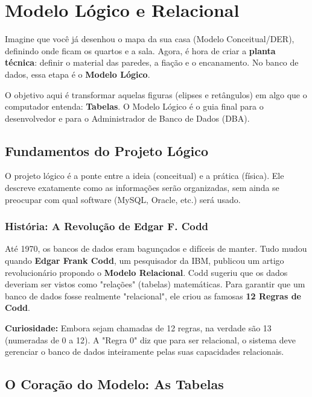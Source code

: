 \chapter{Modelo Lógico e Relacional}
\label{cap:modelo_logico}

Imagine que você já desenhou o mapa da sua casa (Modelo Conceitual/DER), definindo onde ficam os quartos e a sala. Agora, é hora de criar a \textbf{planta técnica}: definir o material das paredes, a fiação e o encanamento. No banco de dados, essa etapa é o \textbf{Modelo Lógico}.

O objetivo aqui é transformar aquelas figuras (elipses e retângulos) em algo que o computador entenda: \textbf{Tabelas}. O Modelo Lógico é o guia final para o desenvolvedor e para o Administrador de Banco de Dados (DBA).

\section{Fundamentos do Projeto Lógico}

O projeto lógico é a ponte entre a ideia (conceitual) e a prática (física). Ele descreve exatamente como as informações serão organizadas, sem ainda se preocupar com qual software (MySQL, Oracle, etc.) será usado.

\subsection{História: A Revolução de Edgar F. Codd}

Até 1970, os bancos de dados eram bagunçados e difíceis de manter. Tudo mudou quando \textbf{Edgar Frank Codd}, um pesquisador da IBM, publicou um artigo revolucionário propondo o \textbf{Modelo Relacional}. Codd sugeriu que os dados deveriam ser vistos como "relações" (tabelas) matemáticas. Para garantir que um banco de dados fosse realmente "relacional", ele criou as famosas \textbf{12 Regras de Codd}. 

\begin{quadro_dica}
\textbf{Curiosidade:} Embora sejam chamadas de 12 regras, na verdade são 13 (numeradas de 0 a 12). A "Regra 0" diz que para ser relacional, o sistema deve gerenciar o banco de dados inteiramente pelas suas capacidades relacionais.
\end{quadro_dica}

\section{O Coração do Modelo: As Tabelas}

